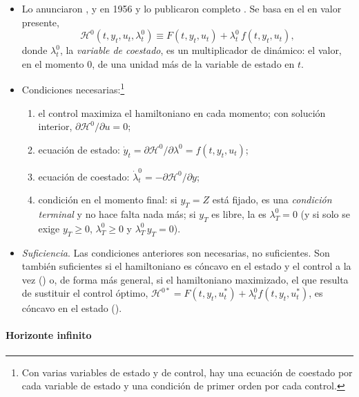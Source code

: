\documentclass[11pt]{article}
\begin{document}
\begin{itemize}
\item Lo anunciaron ,  y  en 1956 y lo publicaron completo \textcite{PontryaginEtAl1962}. Se basa en el  en valor presente,
  \begin{equation*}
  \mathcal{H}^0(t,y_t,u_t,\lambda^0_t)\equiv F(t,y_t,u_t)+\lambda^0_t\,f(t,y_t,u_t),
  \end{equation*}
  donde $\lambda^0_t$, la \emph{variable de coestado}, es un multiplicador de  dinámico: el valor, en el momento 0, de una unidad más de la variable de estado en $t$.
\item Condiciones necesarias:\footnote{Con varias variables de estado y de control, hay una ecuación de coestado por cada variable de estado y una condición de primer orden por cada control.}
  \begin{enumerate}
  \item el control maximiza el hamiltoniano en cada momento; con solución interior, $\partial\mathcal{H}^0/\partial u=0$;
  \item ecuación de estado: $\dot y_t=\partial\mathcal{H}^0/\partial\lambda^0=f(t,y_t,u_t)$;
  \item ecuación de coestado: $\dot\lambda^0_t=-\partial\mathcal{H}^0/\partial y$;
  \item condición en el momento final: si $y_T=Z$ está fijado, es una \emph{condición terminal} y no hace falta nada más; si $y_T$ es libre, la  es $\lambda^0_T=0$ (y si solo se exige $y_T\geq 0$, $\lambda^0_T\geq 0$ y $\lambda^0_T\,y_T=0$).
  \end{enumerate}
\item \emph{Suficiencia}. Las condiciones anteriores son necesarias, no suficientes. Son también suficientes si el hamiltoniano es cóncavo en el estado y el control a la vez () o, de forma más general, si el hamiltoniano maximizado, el que resulta de sustituir el control óptimo, $\mathcal{H}^{0*}=F(t,y_t,u^*_t)+\lambda^0_t f(t,y_t,u^*_t)$, es cóncavo en el estado ().
\end{itemize}

\paragraph{Horizonte infinito}
\end{document}
